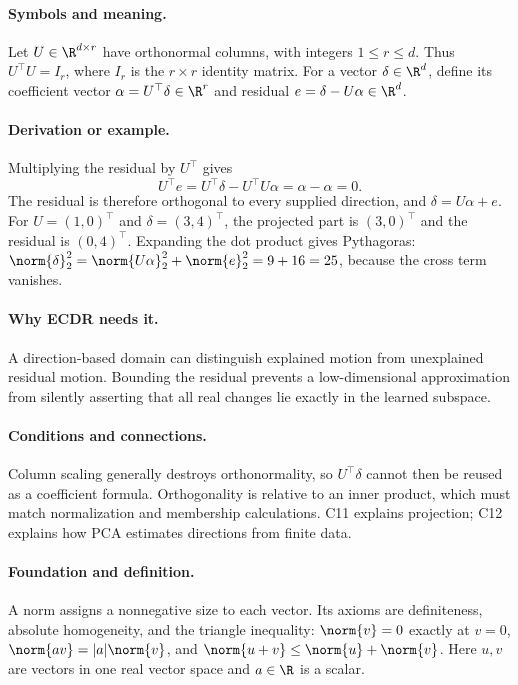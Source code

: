 \paragraph{Symbols and meaning.}
Let $U\in\R^{d\times r}$ have orthonormal columns, with integers
$1\le r\le d$. Thus $U^\top U=I_r$, where $I_r$ is the
$r\times r$ identity matrix. For a vector $\delta\in\R^d$, define
its coefficient vector $\alpha=U^\top\delta\in\R^r$ and residual
$e=\delta-U\alpha\in\R^d$.
\paragraph{Derivation or example.}
Multiplying the residual by $U^\top$ gives
\[
 U^\top e=U^\top\delta-U^\top U\alpha
 =\alpha-\alpha=0.
\]
The residual is therefore orthogonal to every supplied direction, and
$\delta=U\alpha+e$. For $U=(1,0)^\top$ and $\delta=(3,4)^\top$,
the projected part is $(3,0)^\top$ and the residual is $(0,4)^\top$.
Expanding the dot product gives Pythagoras:
$\norm{\delta}_2^2=\norm{U\alpha}_2^2+\norm{e}_2^2=9+16=25$,
because the cross term vanishes.
\paragraph{Why ECDR needs it.}
A direction-based domain can distinguish explained motion from
unexplained residual motion. Bounding the residual prevents a
low-dimensional approximation from silently asserting that all real
changes lie exactly in the learned subspace.
\paragraph{Conditions and connections.}
Column scaling generally destroys orthonormality, so $U^\top\delta$
cannot then be reused as a coefficient formula. Orthogonality is relative
to an inner product, which must match normalization and membership
calculations. C11 explains projection; C12 explains how PCA estimates
directions from finite data.

\paragraph{Foundation and definition.}
A norm assigns a nonnegative size to each vector. Its axioms are
definiteness, absolute homogeneity, and the triangle inequality:
$\norm{v}=0$ exactly at $v=0$,
$\norm{a v}=|a|\norm{v}$, and
$\norm{u+v}\le\norm{u}+\norm{v}$.
Here $u,v$ are vectors in one real vector space and $a\in\R$ is a scalar.
